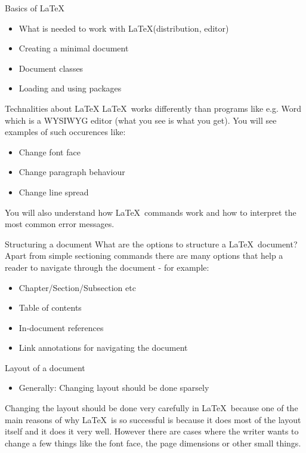\documentclass[10pt, a4paper]{beamer} %
\begin{document}
    \begin{frame}{Basics of \LaTeX}
        \begin{itemize}
            \item What is needed to work with \LaTeX (distribution, editor)
            \item Creating a minimal document
            \item Document classes
            \item Loading and using packages
        \end{itemize}
    \end{frame}
    

    \begin{frame}{Technalities about \LaTeX}
    \LaTeX\ works differently than programs like e.g. Word which is a WYSIWYG editor (what you see is what you get). You will see examples of such occurences like:

    \begin{itemize}
         \item Change font face
         \item Change paragraph behaviour
         \item Change line spread
     \end{itemize}

     You will also understand how \LaTeX\ commands work and how to interpret the most common error messages.
    \end{frame}

    \begin{frame}{Structuring a document}
    What are the options to structure a \LaTeX\ document? Apart from simple sectioning commands there are many options that help a reader to navigate through the document - for example:
    \begin{itemize}
         \item Chapter/Section/Subsection etc
         \item Table of contents
         \item In-document references
         \item Link annotations for navigating the document
     \end{itemize}
    \end{frame}

    \begin{frame}{Layout of a document}
        \begin{itemize}
            \item Generally: Changing layout should be done sparsely
        \end{itemize}
    Changing the layout should be done very carefully in \LaTeX\ because one of the main reasons of why \LaTeX\ is so successful is because it does most of the layout itself and it does it very well. However there are cases where the writer wants to change a few things like the font face, the page dimensions or other small things.
    \end{frame}
\end{document}
